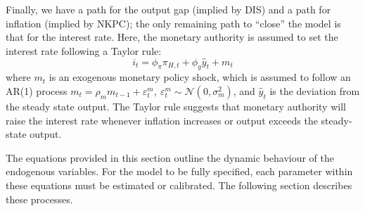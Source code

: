Finally, we have a path for the output gap (implied by DIS) and a path for inflation (implied by NKPC); the only remaining path to ``close'' the model is that for the interest rate. Here, the monetary authority is assumed to set the interest rate following a Taylor rule:
\begin{equation}
 i_t = \phi_\pi \pi_{H,t}+ \phi_y \hat{y}_t + m_t
\end{equation}
where $m_t$ is an exogenous monetary policy shock, which is assumed to follow an AR(1) process $m_t = \rho_m m_{t-1} + \varepsilon^m_{t},\ \varepsilon^m_{t} \sim \mathcal{N}(0,\sigma^2_m)$, and $\hat{y}_t$ is the deviation from the steady state output. The Taylor rule suggests that monetary authority will raise the interest rate whenever inflation increases or output exceeds the steady-state output.

The equations provided in this section outline the dynamic behaviour of the endogenous variables. For the model to be fully specified, each parameter within these equations must be estimated or calibrated. The following section describes these processes.